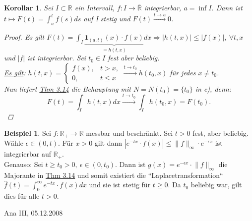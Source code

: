 \documentclass[a4paper]{scrreprt}
\newcommand{\doubleOne}{\textbf{1}}
\newcommand{\R}{\mathbb{R}}
\newcommand{\Rq}{\overline{\R}}
\newcommand{\jlabel}[1]{\label{j_#1}}
\newcommand{\jhyperref}[2]{\hyperref[j_#1]{#2}}
\newcommand{\jlink}[1]{\jhyperref{#1}{#1}}
\newcommand{\jabb}[3]{ #1: #2 \rightarrow #3 }
\newcommand{\jspacesmall}{\vspace{4pt}}
\newcommand{\jdate}[1]{\jspacesmall\begin{center}\jlabel{#1}\tiny{Ana III, #1}\end{center}}
\theoremstyle{plain}
\newtheorem{kor}[thm]{Korollar}
\theoremstyle{definition}
\newtheorem*{expl*}{Beispiel}
\begin{document}
{{{{\begin{kor}
\jlabel{Kor 3.15}
    Sei $I \subset \R$ ein Intervall, $\jabb{f}{I}{\Rq}$ integrierbar, $a=\inf I$. Dann ist $t\mapsto F(t) = \int_a^t f(s)ds$ auf I stetig und $F(t) \xrightarrow{t \rightarrow a} 0$.
    \begin{proof}
        Es gilt $F(t) = \int_I \underbrace{\doubleOne_{(a,t)}(x) \cdot f(x)}_{=h(t,x)} dx \Rightarrow |h(t,x)| \le |f(x)|, \ \forall t,x$ und $|f|$ ist integrierbar. Sei $t_0 \in I$ fest aber beliebig.\\
        \uline{Es gilt}: $h(t,x) = \begin{cases} f(x), & t > x, \\ 0, & t \le x \end{cases} \xrightarrow{t \rightarrow t_0} h(t_0,x)$ für jedes $x \ne t_0$.\\
        Nun liefert \jlink{Thm 3.14} die Behauptung mit $N=N(t_0)=\{t_0\}$ in c), denn:
        \begin{displaymath}
            F(t) = \int_I h(t,x) dx \xrightarrow{t\rightarrow t_0} \int_I h(t_0,x) = F(t_0).
        \end{displaymath}
    \end{proof}
\end{kor}

\begin{expl*}
    Sei $\jabb{f}{\R_+}{\R}$ messbar und beschränkt. Sei $t>0$ fest, aber beliebig. Wähle $\epsilon \in (0,t)$. Für $x>0$ gilt dann $|e^{-tx}\cdot f(x)| \le \lVert f \rVert_\infty \cdot e^{-\epsilon x}$ ist integrierbar auf $\R_+$.\\
    Genauso: Sei $t\ge t_0 > 0, \ \epsilon \in (0,t_0)$. Dann ist $g(x) = e^{-\epsilon x}\cdot \lVert f \rVert_\infty$ die Majorante in \jlink{Thm 3.14} und somit existiert die ``Laplacetransformation``\\
    $\hat{f}(t) = \int_0^\infty e^{-tx}\cdot f(x) dx$ und sie ist stetig für $t\ge 0$. Da $t_0$ beliebig war, gilt dies für alle $t>0$.
\end{expl*}


\jdate{05.12.2008}

}}}}
\end{document}
